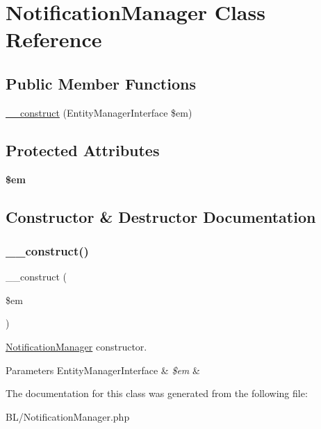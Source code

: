 \hypertarget{class_app_1_1_b_l_1_1_notification_manager}{}\section{Notification\+Manager Class Reference}
\label{class_app_1_1_b_l_1_1_notification_manager}
\subsection*{Public Member Functions}
\begin{DoxyCompactItemize}
\item 
\mbox{\hyperlink{class_app_1_1_b_l_1_1_notification_manager_a25f4258aeb5ce2a61a2504cb7c058485}{\+\_\+\+\_\+construct}} (Entity\+Manager\+Interface \$em)
\end{DoxyCompactItemize}
\subsection*{Protected Attributes}
\begin{DoxyCompactItemize}
\item 
\mbox{\label{class_app_1_1_b_l_1_1_notification_manager_a0f2991d5fed029ef50ef619f1a532d06}} 
{\bfseries \$em}
\end{DoxyCompactItemize}


\subsection{Constructor \& Destructor Documentation}
\mbox{\label{class_app_1_1_b_l_1_1_notification_manager_a25f4258aeb5ce2a61a2504cb7c058485}} 
\subsubsection{\texorpdfstring{\_\_construct()}{\_\_construct()}}
{\footnotesize\ttfamily \+\_\+\+\_\+construct (\begin{DoxyParamCaption}\item[{Entity\+Manager\+Interface}]{\$em }\end{DoxyParamCaption})}

\mbox{\hyperlink{class_app_1_1_b_l_1_1_notification_manager}{Notification\+Manager}} constructor. 
\begin{DoxyParams}[1]{Parameters}
Entity\+Manager\+Interface & {\em \$em} & \\
\hline
\end{DoxyParams}


The documentation for this class was generated from the following file\+:\begin{DoxyCompactItemize}
\item 
B\+L/Notification\+Manager.\+php\end{DoxyCompactItemize}
